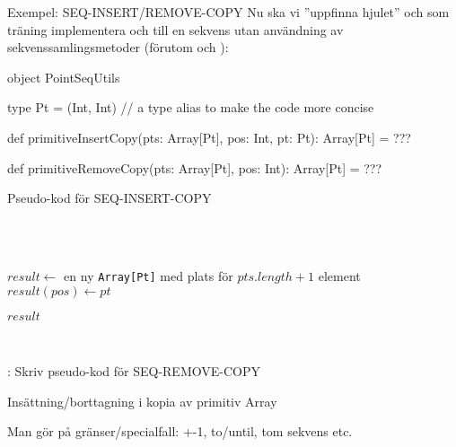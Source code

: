 \begin{Slide}{Exempel: SEQ-INSERT/REMOVE-COPY}
Nu ska vi ''uppfinna hjulet'' och som träning implementera  och  till en  sekvens utan användning av sekvenssamlingsmetoder (förutom  och ):
\begin{Code}
object PointSeqUtils {
  type Pt = (Int, Int)  // a type alias to make the code more concise

  def primitiveInsertCopy(pts: Array[Pt], pos: Int, pt: Pt): Array[Pt] = ???

  def primitiveRemoveCopy(pts: Array[Pt], pos: Int): Array[Pt] = ???
}
\end{Code}
\end{Slide}




\begin{Slide}{Pseudo-kod för SEQ-INSERT-COPY}\SlideFontSmall
\begin{algorithm}[H]

  ~\\

 ~\\


 \noindent\hrulefill

  $result \leftarrow$ en ny \texttt{Array[Pt]} med plats för $pts.length + 1$ element \\
 $result(pos) \leftarrow pt$ \\

 \Return $result$

  \noindent\hrulefill\\
\end{algorithm}
\pause\vspace{0.5em}: Skriv pseudo-kod för SEQ-REMOVE-COPY
\end{Slide}

\begin{Slide}{Insättning/borttagning i kopia av primitiv Array}
\vspace{-0.6em}

\pause
\SlideFontSmall Man gör  på gränser/specialfall: +-1, to/until, tom sekvens etc.
\end{Slide}

